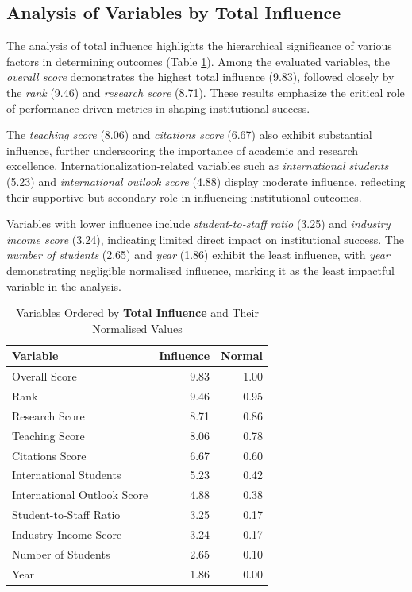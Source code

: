 \documentclass[conference]{IEEEtran}
\begin{document}
\subsection{Analysis of Variables by Total Influence}

The analysis of total influence highlights the hierarchical significance of various factors in determining outcomes (Table \ref{tab:total_influence}). Among the evaluated variables, the \textit{overall score} demonstrates the highest total influence (9.83), followed closely by the \textit{rank} (9.46) and \textit{research score} (8.71). These results emphasize the critical role of performance-driven metrics in shaping institutional success.

The \textit{teaching score} (8.06) and \textit{citations score} (6.67) also exhibit substantial influence, further underscoring the importance of academic and research excellence. Internationalization-related variables such as \textit{international students} (5.23) and \textit{international outlook score} (4.88) display moderate influence, reflecting their supportive but secondary role in influencing institutional outcomes.

Variables with lower influence include \textit{student-to-staff ratio} (3.25) and \textit{industry income score} (3.24), indicating limited direct impact on institutional success. The \textit{number of students} (2.65) and \textit{year} (1.86) exhibit the least influence, with \textit{year} demonstrating negligible normalised influence, marking it as the least impactful variable in the analysis.

\begin{table}[h!]
	\centering
	\caption{Variables Ordered by \textbf{Total Influence} and Their Normalised Values}
	\label{tab:total_influence}
	\begin{tabular}{|l|r|r|}
		\hline
		\textbf{Variable} & \textbf{Influence} & \textbf{Normal} \\
		\hline
		Overall Score & 9.83 & 1.00 \\
		Rank & 9.46 & 0.95 \\
		Research Score & 8.71 & 0.86 \\
		Teaching Score & 8.06 & 0.78 \\
		Citations Score & 6.67 & 0.60 \\
		International Students & 5.23 & 0.42 \\
		International Outlook Score & 4.88 & 0.38 \\
		Student-to-Staff Ratio & 3.25 & 0.17 \\
		Industry Income Score & 3.24 & 0.17 \\
		Number of Students & 2.65 & 0.10 \\
		Year & 1.86 & 0.00 \\
		\hline
	\end{tabular}
\end{table}
\end{document}
